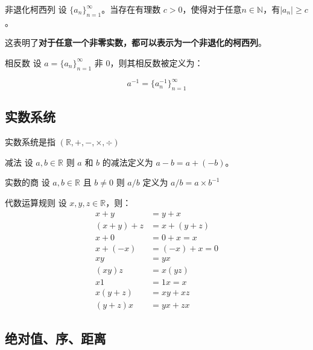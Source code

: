 \begin{definition}{非退化柯西列}{}
	设 $\{a_n\}^\infty_{n=1}$。当存在有理数 $c > 0$，使得对于任意$n\in \mathbb N$，有$|a_n| \ge c$。
\end{definition}

\begin{note}
	这表明了\textbf{对于任意一个非零实数，都可以表示为一个非退化的柯西列}。
\end{note}

\begin{definition}{相反数}{}
	设 $a = \{a_n\}^\infty_{n=1}$ 非 $0$，则其相反数被定义为：
	
	$$
	a^{-1} = \{a_n^{-1}\} _{n=1}^\infty
	$$
\end{definition}

\subsection{实数系统}

\begin{note}
	实数系统是指 $(\mathbb R, +, -, \times, \div)$
\end{note}

\begin{definition}{减法}{}
	设 $a,b\in \mathbb R$ 则 $a$ 和 $b$ 的减法定义为 $a-b = a+ (-b)$。
\end{definition}

\begin{definition}{实数的商}{}
	设 $a,b\in \mathbb R$ 且 $b \ne 0$ 则 $a/b$ 定义为 $a/b = a \times b ^{-1}$
\end{definition}

\begin{theorem}{代数运算规则}{}
	设 $x,y,z\in \mathbb R$，则：
$$
\begin{aligned}
	x+y&=y+x\\
	(x+y)+z & = x+(y+z)\\
	x+0 & = 0+x=x\\
	x + (-x)& = (-x) + x = 0\\
	xy&=yx\\
	(xy)z & = x(yz)\\
	x1&=1x=x\\
	x(y+z) & = xy+xz\\
	(y+z)x & = yx+zx
\end{aligned}
$$
\end{theorem}

\subsection{绝对值、序、距离}

